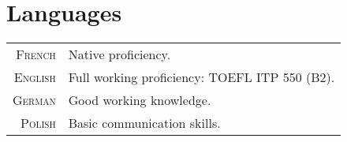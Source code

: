 \documentclass[a4paper,10pt]{article}
\begin{document}
\section{Languages}
\begin{tabular}{rl}
\textsc{French}   & Native proficiency. \\
\textsc{English}  & Full working proficiency: \textsc{TOEFL ITP} 550 (B2). \\
\textsc{German}   & Good working knowledge. \\
\textsc{Polish}   & Basic communication skills.
\end{tabular}


\end{document}
